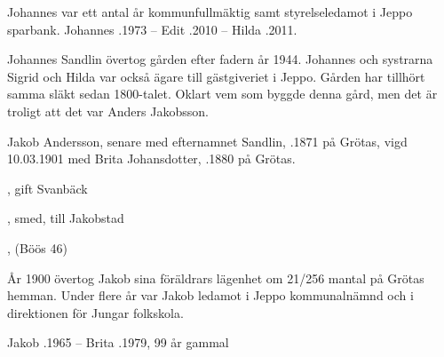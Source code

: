 Johannes var ett antal år kommunfullmäktig samt styrelseledamot i Jeppo sparbank.
Johannes .1973  --  Edit .2010  --  Hilda .2011.



Johannes Sandlin övertog gården efter fadern år 1944. Johannes och systrarna Sigrid och Hilda var också ägare till gästgiveriet i Jeppo. Gården har tillhört samma släkt sedan 1800-talet. Oklart vem som byggde denna gård, men det är troligt att det var Anders Jakobsson.


Jakob Andersson, senare med efternamnet Sandlin, .1871 på Grötas, vigd 10.03.1901 med Brita Johansdotter, .1880 på Grötas.


\begin{jhchildren}
  \item {}
  \item {}
  \item {}, gift Svanbäck
  \item {}
  \item {}
  \item {}, smed, till Jakobstad
  \item {}, (Böös 46)
  \item {}
  \item {}
  \item {}
\end{jhchildren}
År 1900 övertog Jakob sina föräldrars lägenhet om  21/256 mantal på Grötas hemman. Under flere år var Jakob ledamot i Jeppo kommunalnämnd och i direktionen för Jungar folkskola.

Jakob .1965  --  Brita .1979, 99 år gammal


